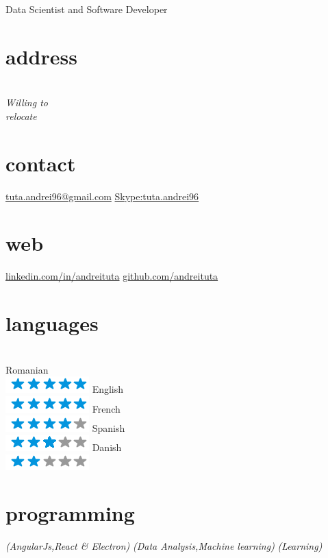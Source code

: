 \documentclass[]{friggeri-cv}
\begin{document}
       {Data Scientist and Software Developer}


\begin{aside}
  \section{address}
    \\
    \emph{Willing to \\relocate}
    ~
    \section{contact}
    \href{mailto:tuta.andrei96@gmail.com}{tuta.andrei96@gmail.com}
    \href{Skype : tuta.andrei96}{Skype:tuta.andrei96}
    ~
    \section{web}
    \href{http://linkedin.com/in/andreituta}{linkedin.com/in/andreituta}
    \href{http://github.com/andreituta}{github.com/andreituta}
    ~ 
    
  \section{languages} 
  \\Romanian \\ \includegraphics[scale=0.30]{img/5stars.png}
  English \\ \includegraphics[scale=0.30]{img/5stars.png}
  French \\ \includegraphics[scale=0.30]{img/4stars.png}
  Spanish \\ \includegraphics[scale=0.30]{img/3stars.png}
  Danish \\ \includegraphics[scale=0.30]{img/2stars.png}
    ~
    
  \section{programming}
    \emph{(AngularJs,React \& Electron)}
     \emph{(Data Analysis,Machine learning)}
     \emph{(Learning)}
    ~

\end{aside}
\end{document}
